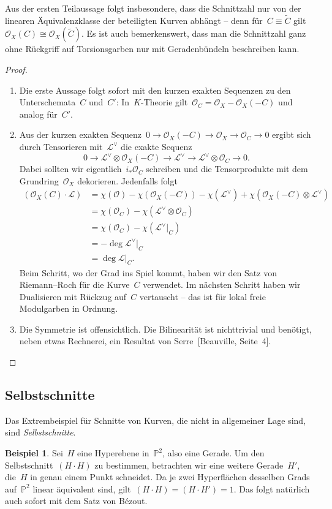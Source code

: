 \documentclass[a4paper,ngerman,12pt]{scrartcl}
\theoremstyle{definition}
\newtheorem{ex}[defn]{Beispiel}
\theoremstyle{plain}
\theoremstyle{remark}
\newcommand{\PP}{\mathbb{P}}
\renewcommand{\L}{\mathcal{L}}
\renewcommand{\O}{\mathcal{O}}
\newcommand{\lra}{\longrightarrow}
\begin{document}
Aus der ersten Teilaussage folgt insbesondere, dass die Schnittzahl nur von der
linearen Äquivalenzklasse der beteiligten Kurven abhängt -- denn für~$C \equiv
\widetilde C$ gilt~$\O_X(C) \cong \O_X(\widetilde C)$. Es ist auch
bemerkenswert, dass man die Schnittzahl ganz ohne Rückgriff auf Torsionsgarben
nur mit Geradenbündeln beschreiben kann.

\begin{proof}
\begin{enumerate}
\item Die erste Aussage folgt sofort mit den kurzen exakten Sequenzen zu den
Unterschemata~$C$ und~$C'$: In~$K$-Theorie gilt~$\O_C = \O_X - \O_X(-C)$ und
analog für~$C'$.
\item Aus der kurzen exakten Sequenz~$0 \to \O_X(-C) \to \O_X \to \O_C \to 0$
ergibt sich durch Tensorieren mit~$\L^\vee$ die exakte Sequenz
\[ 0 \lra \L^\vee \otimes \O_X(-C) \lra \L^\vee \lra \L^\vee \otimes \O_C \lra 0. \]
Dabei sollten wir eigentlich~$i_* \O_C$ schreiben und die Tensorprodukte mit
dem Grundring~$\O_X$ dekorieren. Jedenfalls folgt
\begin{align*}
  (\O_X(C) \cdot \L)
  &= \chi(\O) - \chi(\O_X(-C)) - \chi(\L^\vee) + \chi(\O_X(-C) \otimes \L^\vee) \\
  &= \chi(\O_C) - \chi(\L^\vee \otimes \O_C) \\
  &= \chi(\O_C) - \chi(\L^\vee|_C) \\
  &= -\deg \L^\vee|_C \\
  &= \deg \L|_C.
\end{align*}
Beim Schritt, wo der Grad ins Spiel kommt, haben wir den Satz von Riemann--Roch
für die Kurve~$C$ verwendet. Im nächsten Schritt haben wir Dualisieren mit
Rückzug auf~$C$ vertauscht -- das ist für lokal freie Modulgarben in Ordnung.
\item Die Symmetrie ist offensichtlich. Die Bilinearität ist nichttrivial und
benötigt, neben etwas Rechnerei, ein Resultat von Serre~[Beauville, Seite~4]. \qedhere
\end{enumerate}
\end{proof}


\subsection*{Selbstschnitte}

Das Extrembeispiel für Schnitte von Kurven, die nicht in allgemeiner Lage sind,
sind \emph{Selbstschnitte}.

\begin{ex}Sei~$H$ eine Hyperebene in~$\PP^2$, also eine Gerade. Um den
Selbstschnitt~$(H \cdot H)$ zu bestimmen, betrachten wir eine weitere
Gerade~$H'$, die~$H$ in genau einem Punkt schneidet. Da je zwei Hyperflächen
desselben Grads auf~$\PP^2$ linear äquivalent sind, gilt~$(H \cdot H) = (H \cdot H') = 1$.
Das folgt natürlich auch sofort mit dem Satz von Bézout.
\end{ex}
\end{document}
